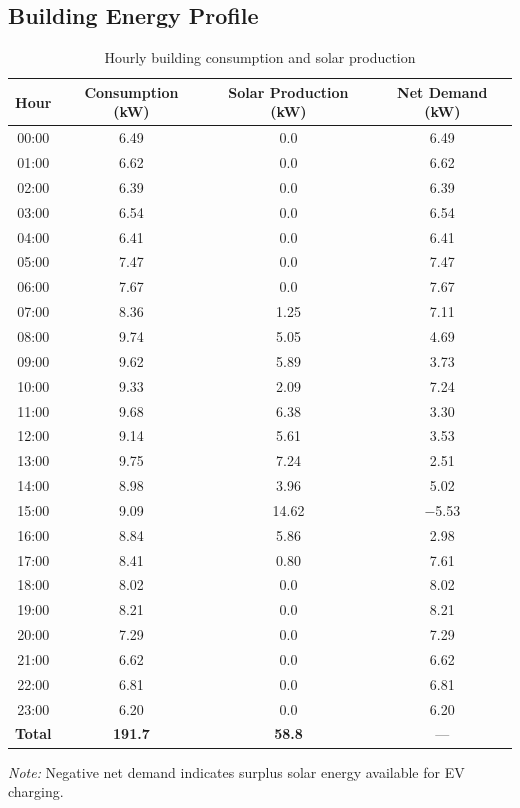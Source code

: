 \subsection{Building Energy Profile}

\begin{table}[H]
\centering
\caption{Hourly building consumption and solar production}
\label{tab:app_building_energy}
\begin{tabular}{@{}cccc@{}}
\toprule
\textbf{Hour} & \textbf{Consumption (kW)} & \textbf{Solar Production (kW)} & \textbf{Net Demand (kW)} \\
\midrule
00:00 & 6.49 & 0.0 & 6.49 \\
01:00 & 6.62 & 0.0 & 6.62 \\
02:00 & 6.39 & 0.0 & 6.39 \\
03:00 & 6.54 & 0.0 & 6.54 \\
04:00 & 6.41 & 0.0 & 6.41 \\
05:00 & 7.47 & 0.0 & 7.47 \\
06:00 & 7.67 & 0.0 & 7.67 \\
07:00 & 8.36 & 1.25 & 7.11 \\
08:00 & 9.74 & 5.05 & 4.69 \\
09:00 & 9.62 & 5.89 & 3.73 \\
10:00 & 9.33 & 2.09 & 7.24 \\
11:00 & 9.68 & 6.38 & 3.30 \\
12:00 & 9.14 & 5.61 & 3.53 \\
13:00 & 9.75 & 7.24 & 2.51 \\
14:00 & 8.98 & 3.96 & 5.02 \\
15:00 & 9.09 & 14.62 & $-$5.53 \\
16:00 & 8.84 & 5.86 & 2.98 \\
17:00 & 8.41 & 0.80 & 7.61 \\
18:00 & 8.02 & 0.0 & 8.02 \\
19:00 & 8.21 & 0.0 & 8.21 \\
20:00 & 7.29 & 0.0 & 7.29 \\
21:00 & 6.62 & 0.0 & 6.62 \\
22:00 & 6.81 & 0.0 & 6.81 \\
23:00 & 6.20 & 0.0 & 6.20 \\
\midrule
\textbf{Total} & \textbf{191.7} & \textbf{58.8} & --- \\
\bottomrule
\end{tabular}
\end{table}

\textit{Note:} Negative net demand indicates surplus solar energy available for EV charging.


